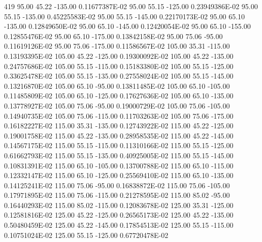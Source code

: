       419
      95.00      45.22    -135.00      0.11677387E-02
      95.00      55.15    -125.00      0.23949386E-02
      95.00      55.15    -135.00      0.45225583E-02
      95.00      55.15    -145.00      0.22170173E-02
      95.00      65.10    -135.00      0.12849650E-02
      95.00      65.10    -145.00      0.12420054E-02
      95.00      65.10    -155.00      0.12855476E-02
      95.00      65.10    -175.00      0.13842158E-02
      95.00      75.06     -95.00      0.11619126E-02
      95.00      75.06    -175.00      0.11586567E-02
     105.00      35.31    -115.00      0.13193395E-02
     105.00      45.22    -125.00      0.19300092E-02
     105.00      45.22    -135.00      0.24757686E-02
     105.00      55.15    -115.00      0.15183380E-02
     105.00      55.15    -125.00      0.33625478E-02
     105.00      55.15    -135.00      0.27558024E-02
     105.00      55.15    -145.00      0.13216870E-02
     105.00      65.10     -95.00      0.13811485E-02
     105.00      65.10    -105.00      0.11485809E-02
     105.00      65.10    -125.00      0.17627636E-02
     105.00      65.10    -135.00      0.13778927E-02
     105.00      75.06     -95.00      0.19000729E-02
     105.00      75.06    -105.00      0.14940735E-02
     105.00      75.06    -115.00      0.11703263E-02
     105.00      75.06    -175.00      0.16182227E-02
     115.00      35.31    -135.00      0.12743922E-02
     115.00      45.22    -125.00      0.19001758E-02
     115.00      45.22    -135.00      0.28958535E-02
     115.00      45.22    -145.00      0.14567175E-02
     115.00      55.15    -115.00      0.11310166E-02
     115.00      55.15    -125.00      0.61662793E-02
     115.00      55.15    -135.00      0.40925005E-02
     115.00      55.15    -145.00      0.10831391E-02
     115.00      65.10    -105.00      0.13700788E-02
     115.00      65.10    -115.00      0.12332147E-02
     115.00      65.10    -125.00      0.25569410E-02
     115.00      65.10    -135.00      0.14125241E-02
     115.00      75.06     -95.00      0.16838872E-02
     115.00      75.06    -105.00      0.17971895E-02
     115.00      75.06    -115.00      0.21278595E-02
     115.00      85.02     -95.00      0.16440293E-02
     115.00      85.02    -115.00      0.12083678E-02
     125.00      35.31    -125.00      0.12581816E-02
     125.00      45.22    -125.00      0.26565173E-02
     125.00      45.22    -135.00      0.50480459E-02
     125.00      45.22    -145.00      0.17854513E-02
     125.00      55.15    -115.00      0.10751024E-02
     125.00      55.15    -125.00      0.67720478E-02
